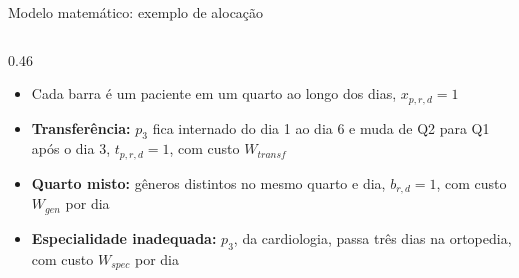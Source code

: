 \documentclass[aspectratio=169,10pt]{beamer}
\begin{document}
\begin{frame}{Modelo matemático: exemplo de alocação}
\begin{columns}[c]
        \begin{column}{0.46\textwidth}
            \begin{itemize}\setlength{\itemsep}{8pt}
                \item Cada barra é um paciente em um quarto ao longo dos dias, $x_{p,r,d} = 1$
                \item \textbf{Transferência:} $p_3$ fica internado do dia 1 ao dia 6 e muda de Q2 para Q1 após o dia 3, $t_{p,r,d} = 1$, com custo $W_{transf}$
                \item \textbf{Quarto misto:} gêneros distintos no mesmo quarto e dia, $b_{r,d} = 1$, com custo $W_{gen}$ por dia
                \item \textbf{Especialidade inadequada:} $p_3$, da cardiologia, passa três dias na ortopedia, com custo $W_{spec}$ por dia
            \end{itemize}
        \end{column}
    \end{columns}
\end{frame}
\end{document}
